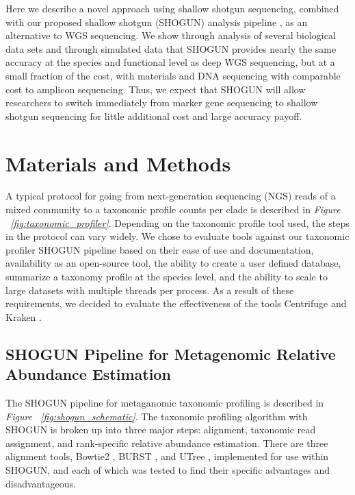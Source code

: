 Here we describe a novel approach using shallow shotgun sequencing, combined with our proposed shallow shotgun (SHOGUN) analysis pipeline \cite{benjamin_hillmann_knights-lab/shogun:_2017}, as an alternative to WGS sequencing. We show through analysis of several biological data sets and through simulated data that SHOGUN provides nearly the same accuracy at the species and functional level as deep WGS sequencing, but at a small fraction of the cost, with materials and DNA sequencing with comparable cost to amplicon sequencing. Thus, we expect that SHOGUN will allow researchers to switch immediately from marker gene sequencing to shallow shotgun sequencing for little additional cost and large accuracy payoff.

\section{Materials and Methods}

A typical protocol for going from next-generation sequencing (NGS) reads of a mixed community to a taxonomic profile counts per clade is described in \textit{Figure ~\ref{fig:taxonomic_profiler}}. Depending on the taxonomic profile tool used, the steps in the protocol can vary widely. We chose to evaluate tools against our taxonomic profiler SHOGUN \cite{benjamin_hillmann_knights-lab/shogun:_2017} pipeline based on their ease of use and documentation, availability as an open-source tool, the ability to create a user defined database, summarize a taxonomy profile at the species level, and the ability to scale to large datasets with multiple threads per process. As a result of these requirements, we decided to evaluate the effectiveness of the tools Centrifuge \cite{kim_centrifuge:_2016} and Kraken \cite{wood_kraken:_2014}.

\subsection{SHOGUN Pipeline for Metagenomic Relative Abundance Estimation}

The SHOGUN pipeline for metaganomic taxonomic profiling is described in \textit{Figure ~\ref{fig:shogun_schematic}}. The taxonomic profiling algorithm with SHOGUN is broken up into three major steps: alignment, taxonomic read assignment, and rank-specific relative abundance estimation. There are three alignment tools, Bowtie2 \cite{langmead_fast_2012}, BURST \cite{gabriel_al-ghalith_knights-lab/burst:_2017}, and UTree \cite{gabriel_al-ghalith_knights-lab/utree:_2017}, implemented for use within SHOGUN, and each of which was tested to find their specific advantages and disadvantageous.

